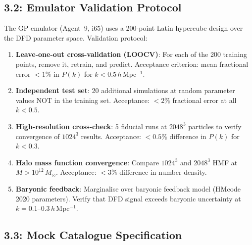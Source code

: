 \documentclass[11pt,a4paper]{article}
\begin{document}
\subsection{3.2: Emulator Validation Protocol}

The GP emulator (Agent~9, i65) uses a 200-point Latin hypercube design over the DFD parameter space. Validation protocol:

\begin{enumerate}
\item \textbf{Leave-one-out cross-validation (LOOCV)}: For each of the 200 training points, remove it, retrain, and predict. Acceptance criterion: mean fractional error $< 1\%$ in $P(k)$ for $k < 0.5\,h\,$Mpc$^{-1}$.

\item \textbf{Independent test set}: 20 additional simulations at random parameter values NOT in the training set. Acceptance: $< 2\%$ fractional error at all $k < 0.5$.

\item \textbf{High-resolution cross-check}: 5 fiducial runs at $2048^3$ particles to verify convergence of $1024^3$ results. Acceptance: $< 0.5\%$ difference in $P(k)$ for $k < 0.3$.

\item \textbf{Halo mass function convergence}: Compare $1024^3$ and $2048^3$ HMF at $M > 10^{12}\,M_\odot$. Acceptance: $< 3\%$ difference in number density.

\item \textbf{Baryonic feedback}: Marginalise over baryonic feedback model (HMcode 2020 parameters). Verify that DFD signal exceeds baryonic uncertainty at $k = 0.1$--$0.3\,h\,$Mpc$^{-1}$.
\end{enumerate}

\subsection{3.3: Mock Catalogue Specification}
\end{document}
